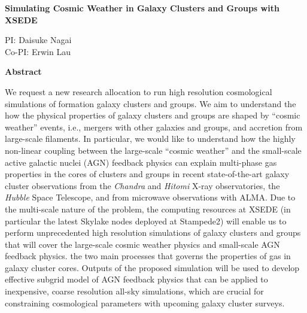 \documentclass[letterpaper,11pt]{article}
\begin{document}
\pagestyle{plain}

\begin{center} 
\Large\bfseries{Simulating Cosmic Weather in Galaxy Clusters and Groups with XSEDE}
\end{center}

\begin{center}
PI: Daisuke Nagai \\
Co-PI: Erwin Lau
\end{center}

\medskip
\centerline{ \large \bf Abstract}
We request a new research allocation to run high resolution cosmological simulations of formation galaxy clusters and groups. We aim to understand the how the physical properties of galaxy clusters and groups are shaped by  ``cosmic weather'' events, i.e., mergers with other galaxies and groups, and accretion from large-scale filaments. In particular, we would like to understand how the highly non-linear coupling between the large-scale ``cosmic weather'' and the small-scale active galactic nuclei (AGN) feedback physics can explain multi-phase gas properties in the cores of clusters and groups in recent state-of-the-art galaxy cluster observations from the {\em Chandra} and {\em Hitomi} X-ray observatories, the {\em Hubble} Space Telescope, and from microwave observations with ALMA. Due to the multi-scale nature of the problem, the computing resources at XSEDE (in particular the latest Skylake nodes deployed at Stampede2) will enable us to perform unprecedented high resolution simulations of galaxy clusters and groups that will cover the large-scale cosmic weather physics and small-scale AGN feedback physics. the two main processes that governs the properties of gas in galaxy cluster cores. Outputs of the proposed simulation will be used to develop effective subgrid model of AGN feedback physics that can be applied to inexpensive, coarse resolution all-sky simulations, which are crucial for constraining cosmological parameters with upcoming galaxy cluster surveys. 
\medskip
\end{document}
